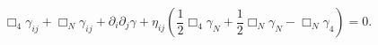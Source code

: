 \begin{equation}
 \Box_4 \gamma_{ij}+\Box_N \gamma_{ij}+\partial_i \partial_j \gamma+ \eta_{i j}
(\frac{1}{2} \Box_4 \gamma_N+\frac{1}{2} \Box_N \gamma_N-\Box_N \gamma_4)=0.
\end{equation}

